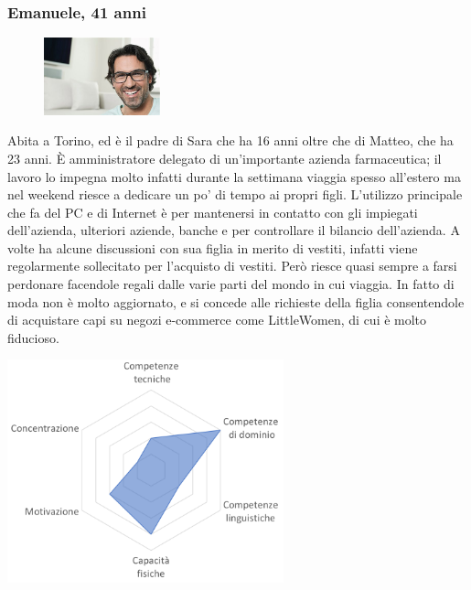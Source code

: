 \documentclass[12pt,a4paper]{report}
\begin{document}
\subsubsection*{Emanuele, 41 anni}
\begin{figure}
  \centering
    \includegraphics[width=0.3\textwidth]{"Images Latex/Personas/Emanuele"}
\end{figure}
Abita a Torino, ed è il padre di Sara che ha 16 anni oltre che di Matteo, che ha 23 anni. È amministratore delegato di un'importante azienda farmaceutica; il lavoro lo impegna molto infatti durante la settimana viaggia spesso all'estero ma nel weekend riesce a dedicare un po' di tempo ai propri figli. L’utilizzo principale che fa del PC e di Internet è per mantenersi in contatto con gli impiegati dell'azienda, ulteriori aziende, banche e per controllare il bilancio dell’azienda. A volte ha alcune discussioni con sua figlia in merito di vestiti, infatti viene regolarmente sollecitato per l’acquisto di vestiti. Però riesce quasi sempre a farsi perdonare facendole regali dalle varie parti del mondo in cui viaggia. In fatto di moda non è molto aggiornato, e si concede alle richieste della figlia consentendole di acquistare capi su negozi e-commerce come LittleWomen, di cui è molto fiducioso.
\begin{center}
  \includegraphics[width=0.6\textwidth]{"Images Latex/Personas/Emanuele41"}
\end{center}
\newpage

\newpage
\end{document}
